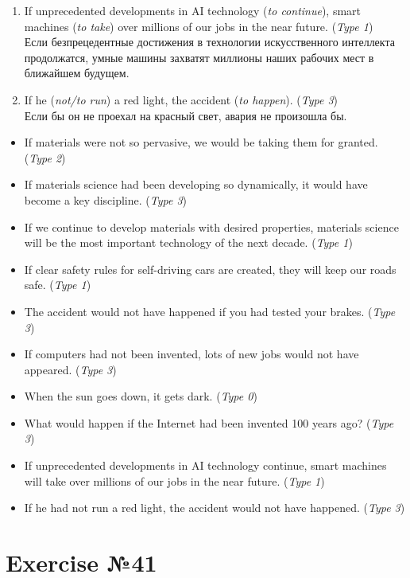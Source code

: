 \begin{enumerate}
      \item If unprecedented developments in AI technology (\textit{to continue}), smart machines (\textit{to take}) over millions of our jobs in the near future. (\textit{Type 1})\\
            Если безпрецедентные достижения в технологии искусственного интеллекта продолжатся, умные машины захватят миллионы наших рабочих мест в ближайшем будущем.

      \item If he (\textit{not/to run}) a red light, the accident (\textit{to happen}). (\textit{Type 3})\\
            Если бы он не проехал на красный свет, авария не произошла бы.
\end{enumerate}

\begin{itemize}
      \item If materials were not so pervasive, we would be taking them for granted. (\textit{Type 2})
      \item If materials science had been developing so dynamically, it would have become a key discipline. (\textit{Type 3})
      \item If we continue to develop materials with desired properties, materials science will be the most important technology of the next decade. (\textit{Type 1})
      \item If clear safety rules for self-driving cars are created, they will keep our roads safe. (\textit{Type 1})
      \item The accident would not have happened if you had tested your brakes. (\textit{Type 3})
      \item If computers had not been invented, lots of new jobs would not have appeared. (\textit{Type 3})
      \item When the sun goes down, it gets dark. (\textit{Type 0})
      \item What would happen if the Internet had been invented 100 years ago? (\textit{Type 3})
      \item If unprecedented developments in AI technology continue, smart machines will take over millions of our jobs in the near future. (\textit{Type 1})
      \item If he had not run a red light, the accident would not have happened. (\textit{Type 3})
\end{itemize}

\section{Exercise №41}
